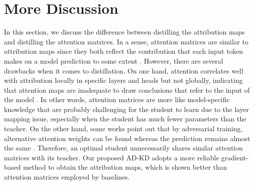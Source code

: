 \documentclass[11pt]{article}
\begin{document}
\section{More Discussion} \label{sec:discussion}
In this section, we discuss the difference between distilling the attribution maps and distilling the attention matrices. In a sense, attention matrices are similar to attribution maps since they both reflect the contribution that each input token makes on a model prediction to some extent \citep{bastings-filippova-2020-elephant,xu-etal-2020-self}. However, there are several drawbacks when it comes to distillation. On one hand, attention correlates well with attribution locally in specific layers and heads but not globally, indicating that attention maps are inadequate to draw conclusions that refer to the input of the model \citep{pascual-etal-2021-telling}. In other words, attention matrices are more like model-specific knowledge that are probably challenging for the student to learn due to the layer mapping issue, especially when the student has much fewer parameters than the teacher. On the other hand, some works point out that by adversarial training, alternative attention weights can be found whereas the prediction remains almost the same \citep{jain-wallace-2019-attention,wiegreffe-pinter-2019-attention}. Therefore, an optimal student unnecessarily shares similar attention matrices with its teacher. Our proposed AD-KD adopts a more reliable gradient-based method to obtain the attribution maps, which is shown better than attention matrices employed by baselines.
\end{document}
